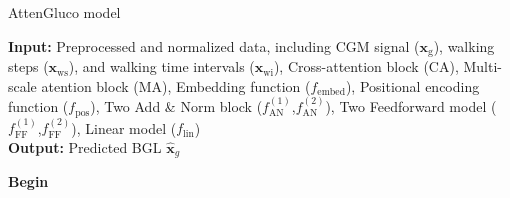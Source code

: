 \begin{algorithm}
\small
\caption{AttenGluco model}
\label{alg:TransformerBGL}
\textbf{Input:} Preprocessed and normalized data, including CGM signal ($\mathbf{x}_{\text{g}}$), walking steps ($\mathbf{x}_{\text{ws}}$), and walking time intervals ($\mathbf{x}_{\text{wi}}$), Cross-attention block (CA), Multi-scale atention block (MA), Embedding function ($f_{\text{embed}}$), Positional encoding function ($f_{\text{pos}}$), Two Add \& Norm block ($f_{\text{AN}}^{(1)}$,$f_{\text{AN}}^{(2)}$), Two Feedforward model ($f_\text{FF}^{(1)}$,$f_\text{FF}^{(2)}$), Linear model ($f_\text{lin}$) \\
\textbf{Output:} Predicted BGL $\mathbf{\hat{x}}_g$\\
\begin{algorithmic}[1]
\State \textbf{Begin}


\end{algorithmic}
\end{algorithm}
